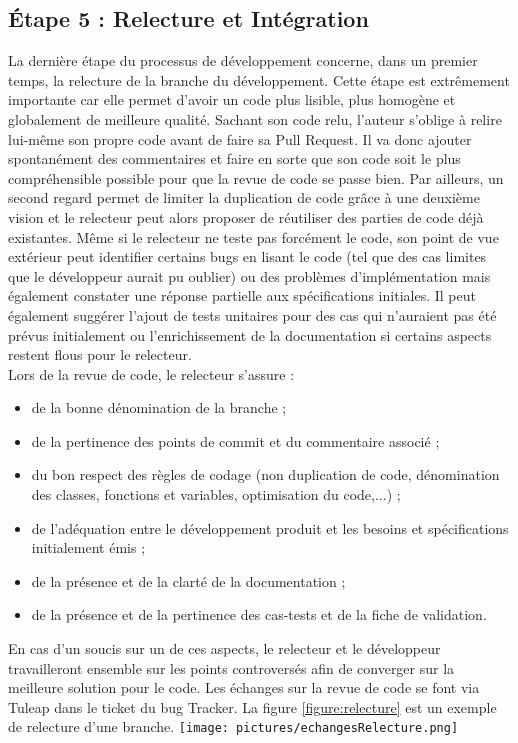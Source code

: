 \subsection{\label{subsec:relecture}Étape 5 : Relecture et Int\'egration}
La dernière étape du processus de développement concerne, dans un premier temps,
la relecture de la branche du développement.
Cette étape est extrêmement importante car elle permet d'avoir un code plus lisible,
plus homogène et globalement de meilleure qualité.
Sachant son code relu, l'auteur s'oblige à relire lui-même son propre code avant de faire sa Pull Request.
Il va donc ajouter spontanément des commentaires et faire en sorte que son code
soit le plus compréhensible possible pour que la revue de code se passe bien.
Par ailleurs, un second regard permet de limiter la duplication de code grâce à une
deuxième vision et le relecteur peut alors proposer de réutiliser des parties de code déjà existantes.
Même si le relecteur ne teste pas forcément le code, son point de vue extérieur peut identifier
certains bugs en lisant le code (tel que des cas limites que le développeur aurait pu oublier)
ou des problèmes d'implémentation mais également constater une réponse partielle aux spécifications initiales.
Il peut également suggérer l'ajout de tests unitaires pour des cas qui n'auraient pas été prévus
initialement ou l'enrichissement de la documentation si certains aspects restent flous pour le relecteur.\\
Lors de la revue de code, le relecteur s'assure :
\begin{itemize}
  \item de la bonne dénomination de la branche ;
  \item de la pertinence des points de commit et du commentaire associé ;
  \item du bon respect des règles de codage (non duplication de code,
        dénomination des classes, fonctions et variables, optimisation du code,...) ;
  \item de l'adéquation entre le développement produit et les besoins et spécifications initialement émis ;
  \item de la présence et de la clarté de la documentation ;
  \item de la présence et de la pertinence des cas-tests et de la fiche de validation.
\end{itemize}

En cas d'un soucis sur un de ces aspects, le relecteur et le développeur travailleront
ensemble sur les points controversés afin de converger sur la meilleure solution pour le code.
Les échanges sur la revue de code se font via Tuleap dans le ticket du bug Tracker.
La figure \ref{figure:relecture} est un exemple de relecture d'une branche.
   \texttt{[image: pictures/echangesRelecture.png]}\vspace*{0.1cm}
\vspace*{0.7cm}   

